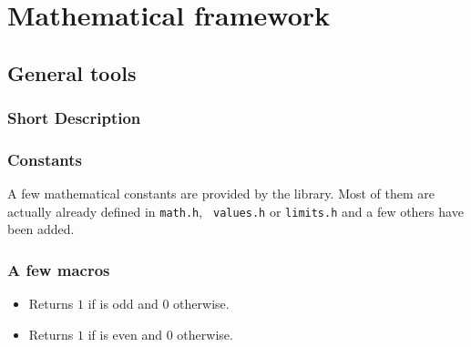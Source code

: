 \section{Mathematical framework}

\subsection{General tools}
\subsubsection{Short Description}

\subsubsection{Constants} A few mathematical constants are provided by the
library. Most of them are actually already defined in {\tt math.h}, {\tt
  values.h} or {\tt limits.h} and a few others have been added.
\begin{describeconst}
\end{describeconst}

\subsubsection{A few macros}
\begin{itemize}
\item {}
  \sshortdescribe Returns $1$ if  is odd and $0$ otherwise.
\item {}
  \sshortdescribe Returns $1$ if  is even and $0$ otherwise.
\end{itemize}

